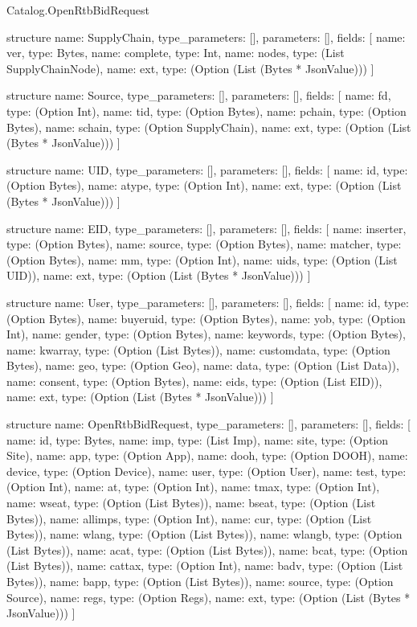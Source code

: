 \begin{lexlean}{Catalog.OpenRtbBidRequest}
\begin{semanticmodule}
structure{
  name: SupplyChain,
  type_parameters: [],
  parameters: [],
  fields: [
    {name: ver, type: Bytes},
    {name: complete, type: Int},
    {name: nodes, type: (List SupplyChainNode)},
    {name: ext, type: (Option (List (Bytes * JsonValue)))}
  ]
}

structure{
  name: Source,
  type_parameters: [],
  parameters: [],
  fields: [
    {name: fd, type: (Option Int)},
    {name: tid, type: (Option Bytes)},
    {name: pchain, type: (Option Bytes)},
    {name: schain, type: (Option SupplyChain)},
    {name: ext, type: (Option (List (Bytes * JsonValue)))}
  ]
}

structure{
  name: UID,
  type_parameters: [],
  parameters: [],
  fields: [
    {name: id, type: (Option Bytes)},
    {name: atype, type: (Option Int)},
    {name: ext, type: (Option (List (Bytes * JsonValue)))}
  ]
}

structure{
  name: EID,
  type_parameters: [],
  parameters: [],
  fields: [
    {name: inserter, type: (Option Bytes)},
    {name: source, type: (Option Bytes)},
    {name: matcher, type: (Option Bytes)},
    {name: mm, type: (Option Int)},
    {name: uids, type: (Option (List UID))},
    {name: ext, type: (Option (List (Bytes * JsonValue)))}
  ]
}

structure{
  name: User,
  type_parameters: [],
  parameters: [],
  fields: [
    {name: id, type: (Option Bytes)},
    {name: buyeruid, type: (Option Bytes)},
    {name: yob, type: (Option Int)},
    {name: gender, type: (Option Bytes)},
    {name: keywords, type: (Option Bytes)},
    {name: kwarray, type: (Option (List Bytes))},
    {name: customdata, type: (Option Bytes)},
    {name: geo, type: (Option Geo)},
    {name: data, type: (Option (List Data))},
    {name: consent, type: (Option Bytes)},
    {name: eids, type: (Option (List EID))},
    {name: ext, type: (Option (List (Bytes * JsonValue)))}
  ]
}

structure{
  name: OpenRtbBidRequest,
  type_parameters: [],
  parameters: [],
  fields: [
    {name: id, type: Bytes},
    {name: imp, type: (List Imp)},
    {name: site, type: (Option Site)},
    {name: app, type: (Option App)},
    {name: dooh, type: (Option DOOH)},
    {name: device, type: (Option Device)},
    {name: user, type: (Option User)},
    {name: test, type: (Option Int)},
    {name: at, type: (Option Int)},
    {name: tmax, type: (Option Int)},
    {name: wseat, type: (Option (List Bytes))},
    {name: bseat, type: (Option (List Bytes))},
    {name: allimps, type: (Option Int)},
    {name: cur, type: (Option (List Bytes))},
    {name: wlang, type: (Option (List Bytes))},
    {name: wlangb, type: (Option (List Bytes))},
    {name: acat, type: (Option (List Bytes))},
    {name: bcat, type: (Option (List Bytes))},
    {name: cattax, type: (Option Int)},
    {name: badv, type: (Option (List Bytes))},
    {name: bapp, type: (Option (List Bytes))},
    {name: source, type: (Option Source)},
    {name: regs, type: (Option Regs)},
    {name: ext, type: (Option (List (Bytes * JsonValue)))}
  ]
}
\end{semanticmodule}
\end{lexlean}
